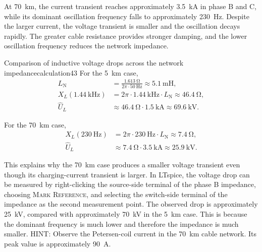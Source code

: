 At \SI{70}{\kilo\metre}, the current transient reaches approximately
\SI{3.5}{\kilo\ampere} in phase B and C, while its dominant oscillation frequency falls to
approximately \SI{230}{\hertz}. Despite the larger current, the voltage
transient is smaller and the oscillation decays rapidly. The greater cable
resistance provides stronger damping, and the lower oscillation frequency
reduces the network impedance.

\vspace{1cm}

\begin{calculation}{Comparison of inductive voltage drops across the network impedance}{calculation43}
For the \SI{5}{\kilo\metre} case,
\begin{align}
L_{\mathrm N}&=\frac{\SI{1.613}{\ohm}}
 {2\pi\cdot\SI{50}{\hertz}}\approx\SI{5.1}{\milli\henry},\\
X_L(\SI{1.44}{\kilo\hertz})
 &=2\pi\cdot\SI{1.44}{\kilo\hertz}\cdot L_{\mathrm N}
   \approx\SI{46.4}{\ohm},\\
\widehat U_L&\approx\SI{46.4}{\ohm}\cdot\SI{1.5}{\kilo\ampere}
  \approx\SI{69.6}{\kilo\volt}.
\end{align}

For the \SI{70}{\kilo\metre} case,
\begin{align}
X_L(\SI{230}{\hertz})
 &=2\pi\cdot\SI{230}{\hertz}\cdot L_{\mathrm N}
   \approx\SI{7.4}{\ohm},\\
\widehat U_L&\approx\SI{7.4}{\ohm}\cdot\SI{3.5}{\kilo\ampere}
  \approx\SI{25.9}{\kilo\volt}.
\end{align}
\end{calculation}

\vspace{1cm}

This explains why the \SI{70}{\kilo\metre} case produces a smaller voltage
transient even though its charging-current transient is larger. In LTspice,
the voltage drop can be measured by right-clicking the source-side terminal of the phase B impedance, choosing \textsc{Mark Reference}, and selecting the switch-side terminal of the impedance
 as the second measurement point. The observed drop is approximately
\SI{25}{\kilo\volt}, compared with approximately \SI{70}{\kilo\volt} in the
\SI{5}{\kilo\metre} case. This is because the dominant frequency is much lower and therefore the impedance is much smaller. HINT: Observe the Petersen-coil current in the \SI{70}{\kilo\metre} cable network. Its peak value is approximately \SI{90}{\ampere}.  

